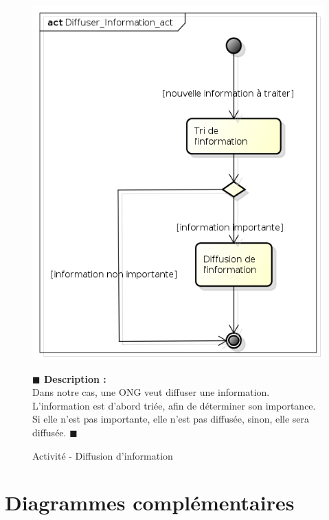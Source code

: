 \documentclass[11pt, titlepage]{report}
\newcommand{\debutDescription}{\noindent\textbf{\textcolor{DescriptionColor}{$\blacksquare$  Description : \\}}}
\newcommand{\finDescription}{\noindent\textcolor{DescriptionColor}{$\blacksquare$}}
\begin{document}
\begin{figure}[h!]
\begin{center}
 \includegraphics[scale=.4]{../images/diagrammes/uml/exigence_5/act_diffuser_information_act.png} 
\caption{Activité - Diffusion d'information}
\end{center}
\debutDescription
 Dans notre cas, une ONG veut diffuser une information. L'information est d'abord triée, afin de déterminer son importance. Si elle n'est pas importante, elle n'est pas diffusée, sinon, elle sera diffusée.
\finDescription
\end{figure}
\clearpage
\section{Diagrammes complémentaires}
\end{document}
